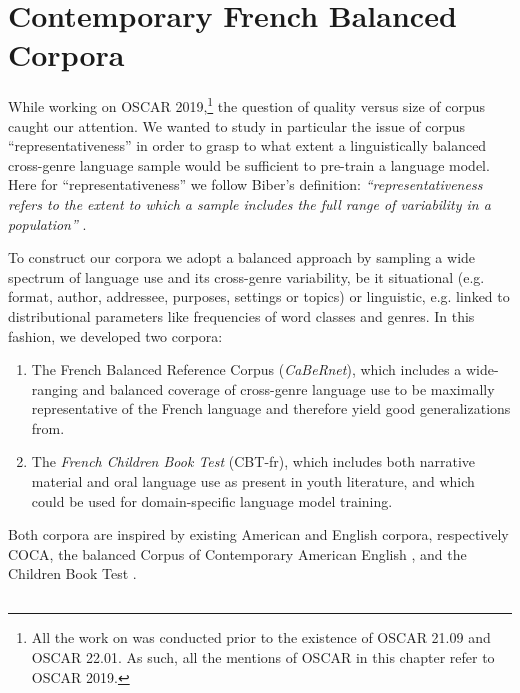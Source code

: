 \section{Contemporary French Balanced Corpora}
\label{sec:DescribeCorpora}

While working on OSCAR 2019,\footnote{All the work on \Cabernet was conducted prior to the existence of OSCAR 21.09 and OSCAR 22.01. As such, all the mentions of OSCAR in this chapter refer to OSCAR 2019.} the question of quality versus size of corpus caught our attention. We wanted to study in particular the issue of corpus ``representativeness'' in order to grasp to what extent a linguistically balanced cross-genre language sample would be sufficient to pre-train a language model. Here for ``representativeness'' we follow Biber's definition: \emph{“representativeness refers to the extent to which a sample includes the full range of variability in a population”} \citep{biber-1993-representativeness}.

To construct our corpora we adopt a balanced approach by sampling a wide spectrum of language use and its cross-genre variability, be it situational (e.g. format, author, addressee, purposes, settings or topics) or linguistic, e.g. linked to distributional parameters like frequencies of word classes and genres. In this fashion, we developed two corpora:
\begin{enumerate}
    \item The French Balanced Reference Corpus (\emph{CaBeRnet}), which includes a wide-ranging and balanced coverage of cross-genre language use to be maximally representative of the French language and therefore yield good generalizations from.
    \item The \emph{French Children Book Test} (CBT-fr), which includes both narrative material and oral language use as present in youth literature, and which could be used for domain-specific language model training.
\end{enumerate}

Both corpora are inspired by existing American and English corpora, respectively  COCA, the balanced Corpus of Contemporary American English \citep{davies-2009-the, davies-2010-the}, and the Children Book Test \citep[CBT]{hill-etal-2016-the}.

\subsection{\Cabernet} \label{subsec:DescribeCaBeRnet}

